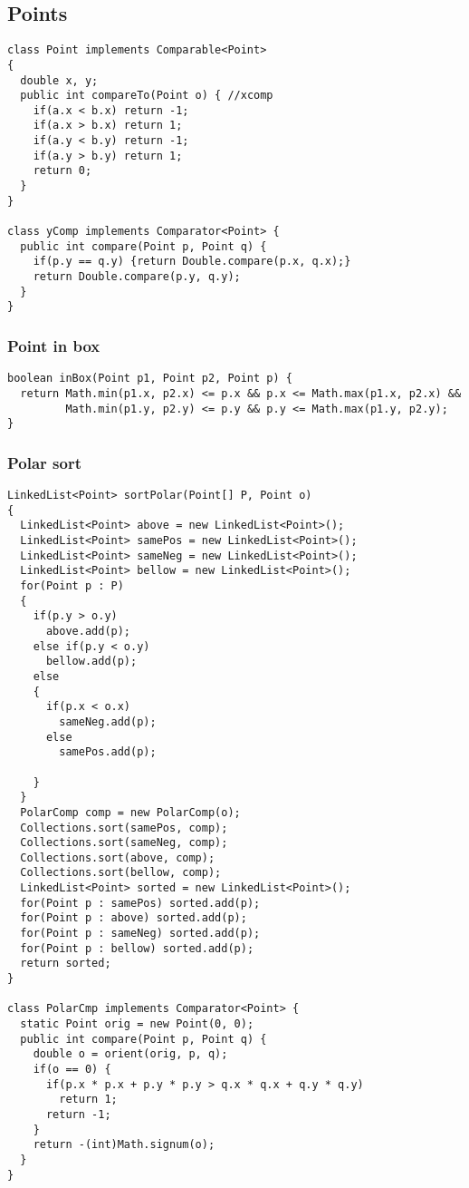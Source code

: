 \subsection{Points}
\begin{lstlisting}
class Point implements Comparable<Point>
{
  double x, y;
  public int compareTo(Point o) { //xcomp
    if(a.x < b.x) return -1;
    if(a.x > b.x) return 1;
    if(a.y < b.y) return -1;
    if(a.y > b.y) return 1;
    return 0;
  }
}

class yComp implements Comparator<Point> {
  public int compare(Point p, Point q) {
    if(p.y == q.y) {return Double.compare(p.x, q.x);}
    return Double.compare(p.y, q.y);
  }
}
\end{lstlisting}
\subsubsection{Point in box}
\begin{lstlisting}
boolean inBox(Point p1, Point p2, Point p) {
  return Math.min(p1.x, p2.x) <= p.x && p.x <= Math.max(p1.x, p2.x) &&			           
         Math.min(p1.y, p2.y) <= p.y && p.y <= Math.max(p1.y, p2.y);
}
\end{lstlisting}
\subsubsection{Polar sort}
\begin{lstlisting}
LinkedList<Point> sortPolar(Point[] P, Point o)
{
  LinkedList<Point> above = new LinkedList<Point>();
  LinkedList<Point> samePos = new LinkedList<Point>();
  LinkedList<Point> sameNeg = new LinkedList<Point>();
  LinkedList<Point> bellow = new LinkedList<Point>();
  for(Point p : P)
  {
    if(p.y > o.y)
      above.add(p);
    else if(p.y < o.y)
      bellow.add(p);
    else
    {
      if(p.x < o.x)
        sameNeg.add(p);
      else
        samePos.add(p);

    }
  }
  PolarComp comp = new PolarComp(o);    
  Collections.sort(samePos, comp);
  Collections.sort(sameNeg, comp);
  Collections.sort(above, comp);
  Collections.sort(bellow, comp);
  LinkedList<Point> sorted = new LinkedList<Point>();
  for(Point p : samePos) sorted.add(p);
  for(Point p : above) sorted.add(p);
  for(Point p : sameNeg) sorted.add(p);
  for(Point p : bellow) sorted.add(p);
  return sorted;
}

class PolarCmp implements Comparator<Point> {
  static Point orig = new Point(0, 0);
  public int compare(Point p, Point q) {
    double o = orient(orig, p, q);
    if(o == 0) {
      if(p.x * p.x + p.y * p.y > q.x * q.x + q.y * q.y)
        return 1;
      return -1;
    }
    return -(int)Math.signum(o);
  }
}
\end{lstlisting}
